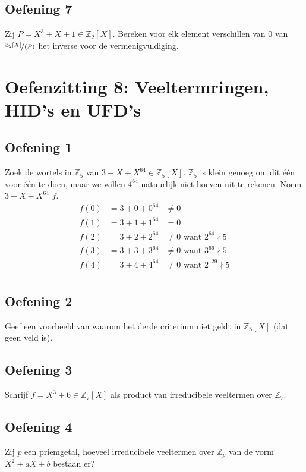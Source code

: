 \documentclass[main.tex]{subfiles}
\begin{document}
\subsection*{Oefening 7}
Zij $P=X^{3}+X+1 \in \mathbb{Z}_{2}[X]$.
Bereken voor elk element verschillen van $0$ van $\nicefrac{\mathbb{Z}_{2}[X]}{(P)}$ het inverse voor de vermenigvuldiging.

\section{Oefenzitting 8: Veeltermringen, HID's en UFD's}

\subsection*{Oefening 1}
Zoek de wortels in $\mathbb{Z}_{5}$ van $3+X+X^{64}\in \mathbb{Z}_{5}[X]$.
$\mathbb{Z}_{5}$ is klein genoeg om dit \'e\'en voor \'e\'en te doen, maar we willen $4^{64}$ natuurlijk niet hoeven uit te rekenen.
Noem $3+X+X^{64}$ $f$.
\[
\begin{array}{rll}
  f(0) &= 3 + 0 + 0^{64} &\neq 0\\
  f(1) &= 3 + 1 + 1^{64} &= 0\\
  f(2) &= 3 + 2 + 2^{64} &\neq 0 \text{ want } 2^{64} \nmid 5\\
  f(3) &= 3 + 3 + 3^{64} &\neq 0 \text{ want } 3^{66} \nmid 5\\
  f(4) &= 3 + 4 + 4^{64} &\neq 0 \text{ want } 2^{129} \nmid 5\\
\end{array}
\]
 
\subsection*{Oefening 2}
Geef een voorbeeld van waarom het derde criterium niet geldt in $\mathbb{Z}_{8}[X]$ (dat geen veld is).

\subsection*{Oefening 3}
Schrijf $f=X^{3}+6\in \mathbb{Z}_{7}[X]$ als product van irreducibele veeltermen over $\mathbb{Z}_{7}$.

\subsection*{Oefening 4}
Zij $p$ een priemgetal, hoeveel irreducibele veeltermen over $\mathbb{Z}_{p}$ van de vorm $X^{2}+aX+b$ bestaan er?
\end{document}
